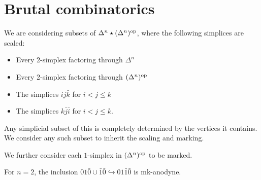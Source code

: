 \documentclass[main.tex]{subfiles}
\begin{document}
\section{Brutal combinatorics}
\label{sec:brutal_combinatorics}

We are considering subsets of $\Delta^{n} \star (\Delta^{n})^{\mathrm{op}}$, where the following simplices are scaled:
\begin{itemize}
  \item Every 2-simplex factoring through $\Delta^{n}$

  \item Every 2-simplex factoring through $(\Delta^{n})^{\mathrm{op}}$

  \item The simplices $ij\bar{k}$ for $i < j \leq k$

  \item The simplices $k\bar{j}\bar{i}$ for $i < j \leq k$.
\end{itemize}

Any simplicial subset of this is completely determined by the vertices it contains. We consider any such subset to inherit the scaling and marking.

We further consider each $1$-simplex in $(\Delta^{n})^{\mathrm{op}}$ to be marked.

\begin{lemma}
  For $n = 2$, the inclusion $01\bar{0} \cup \bar{1}\bar{0} \hookrightarrow 01\bar{1}\bar{0}$ is mk-anodyne.
\end{lemma}
\end{document}
